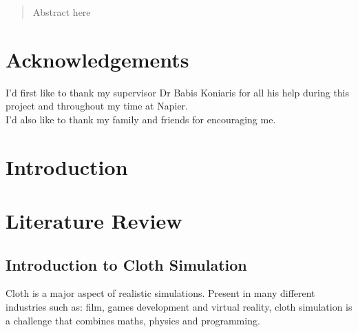 \documentclass[12pt,a4paper]{article}
\begin{document}
	

	



\pagebreak

\pagebreak

\begin{abstract}
Abstract here
\end{abstract}
\pagebreak

\tableofcontents %
\newpage

\listoftables
\newpage

\listoffigures
\newpage

\section*{Acknowledgements}
I'd first like to thank my supervisor Dr Babis Koniaris for all his help during this project and throughout my time at Napier.\\

I'd also like to thank my family and friends for encouraging me.

\newpage

\section{Introduction}
\newpage
\section{Literature Review}
\subsection{Introduction to Cloth Simulation}
Cloth is a major aspect of realistic simulations. Present in many different industries such as: film, games development and virtual reality, cloth simulation is a challenge that combines maths, physics and programming. \\
\end{document}
